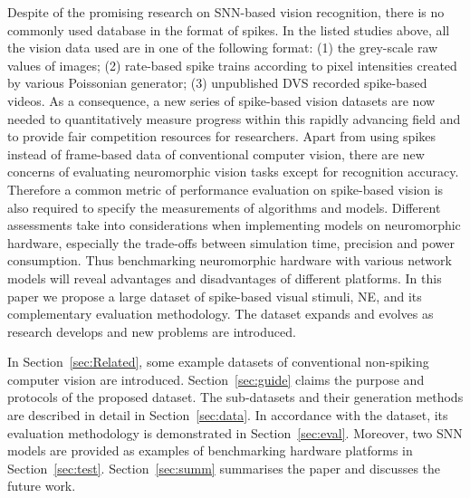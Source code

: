 Despite of the promising research on SNN-based vision recognition, there is no commonly used database in the format of spikes.
In the listed studies above, all the vision data used are in one of the following format:
(1) the grey-scale raw values of images;
(2) rate-based spike trains according to pixel intensities created by various Poissonian generator;
(3) unpublished DVS recorded spike-based videos.
As a consequence, a new series of spike-based vision datasets are now needed to quantitatively measure progress within this rapidly advancing field and to provide fair competition resources for researchers.
Apart from using spikes instead of frame-based data of conventional computer vision, there are new concerns of evaluating neuromorphic vision tasks except for recognition accuracy.
Therefore a common metric of performance evaluation on spike-based vision is also required to specify the measurements of algorithms and models. 
Different assessments take into considerations when implementing models on neuromorphic hardware, especially the trade-offs between simulation time, precision and power consumption.
Thus benchmarking neuromorphic hardware with various network models will reveal advantages and disadvantages of different platforms.
In this paper we propose a large dataset of spike-based visual stimuli, NE, and its complementary evaluation methodology.
The dataset expands and evolves as research develops and new problems are introduced.

In Section~\ref{sec:Related}, some example datasets of conventional non-spiking computer vision are introduced.
Section~\ref{sec:guide} claims the purpose and protocols of the proposed dataset.
The sub-datasets and their generation methods are described in detail in Section~\ref{sec:data}.
In accordance with the dataset, its evaluation methodology is demonstrated in Section~\ref{sec:eval}.
Moreover, two SNN models are provided as examples of benchmarking hardware platforms in Section~\ref{sec:test}.
Section~\ref{sec:summ} summarises the paper and discusses the future work.
